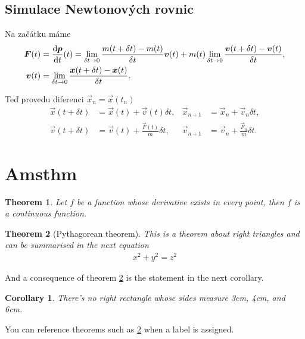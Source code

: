 \documentclass[11pt,a4paper]{report}
\newtheorem{theorem}{Theorem}[section]
\newtheorem{corollary}{Corollary}[theorem]
\theoremstyle{remark}
\theoremstyle{definition}
\begin{document}
		\subsection{Simulace Newtonových rovnic}
		
			\noindent
			Na začátku máme
			\begin{align*}
				\boldsymbol F(t) &= \frac{{\mathrm d} \boldsymbol p}{{\mathrm d} t}(t) = \lim_{\delta t \to 0} \frac{m(t + \delta t) - m(t)}{\delta t} \boldsymbol v(t) + m(t) \lim_{\delta t \to 0} \frac{\boldsymbol v(t + \delta t) - \boldsymbol v(t)}{\delta t},
			\\
				\boldsymbol v(t) &= \lim_{\delta t \to 0} \frac{\boldsymbol x(t + \delta t) - \boldsymbol x(t)}{\delta t}.
			\end{align*}
			
			\noindent
			Teď provedu diferenci $\vec x_n = \vec x(t_n)$
			\begin{align*}
				\vec x(t + \delta t) &= \vec x(t) + \vec v(t) \delta t,
				&
				\vec x_{n+1} &= \vec x_n + \vec v_n \delta t,
			\\
				\vec v(t + \delta t) &= \vec v(t) + \frac{\vec F(t)}{m}\delta t,
				&
				\vec v_{n+1} &= \vec v_n + \frac{\vec F_n}{m} \delta t.
			\end{align*}
		
		\section*{Amsthm}
			
			\begin{theorem}
				Let $f$ be a function whose derivative exists in every point, then $f$ is 
				a continuous function.
			\end{theorem}
			
			\begin{theorem}[Pythagorean theorem]
				\label{pythagorean}
				This is a theorem about right triangles and can be summarised in the next 
				equation 
				\begin{align*}
					x^2 + y^2 = z^2
				\end{align*}
			\end{theorem}
			
			And a consequence of theorem \ref{pythagorean} is the statement in the next 
			corollary.
			
			\begin{corollary}
				There's no right rectangle whose sides measure 3cm, 4cm, and 6cm.
			\end{corollary}
			
			You can reference theorems such as \ref{pythagorean} when a label is assigned.
			
\end{document}

